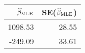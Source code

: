 \begin{table}[ht]
\centering
\begin{tabular}{rr}
  \hline
$\widehat{\beta}_\text{MLE}$ & SE($\widehat{\beta}_\text{MLE}$) \\ 
  \hline
1098.53 & 28.55 \\ 
  -249.09 & 33.61 \\ 
   \hline
\end{tabular}
\end{table}
